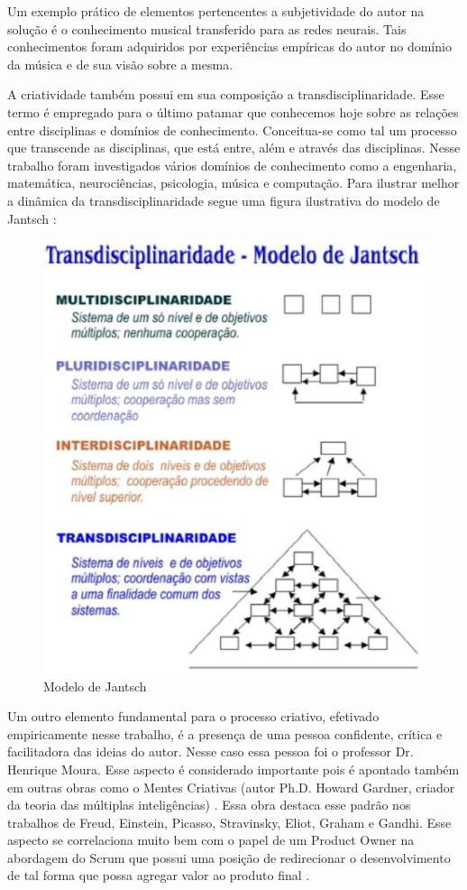 Um exemplo prático de elementos pertencentes a subjetividade do autor na solução é o conhecimento musical transferido para as redes neurais. Tais conhecimentos foram adquiridos por experiências empíricas do autor no domínio da música e de sua visão sobre a mesma.

A criatividade também possui em sua composição a transdisciplinaridade. Esse termo é empregado para o último patamar que conhecemos hoje sobre as relações entre disciplinas e domínios de conhecimento. Conceitua-se como tal um processo que transcende as disciplinas, que está entre, além e através das disciplinas. Nesse trabalho foram investigados vários domínios de conhecimento como a engenharia, matemática, neurociências, psicologia, música e computação. Para ilustrar melhor a dinâmica da transdisciplinaridade segue uma figura ilustrativa do modelo de Jantsch \cite{jantsh}:

\begin{figure}[h]
	\centering
		\includegraphics[keepaspectratio=true,scale=0.7]{figuras/trans.eps}
	\caption{Modelo de Jantsch}
\end{figure}

Um outro elemento fundamental para o processo criativo, efetivado empiricamente nesse trabalho, é a presença de uma pessoa confidente, crítica e facilitadora das ideias do autor. Nesse caso essa pessoa foi o professor Dr. Henrique Moura. Esse aspecto é considerado importante pois é apontado também em outras obras como o Mentes Criativas (autor Ph.D. Howard Gardner, criador da teoria das múltiplas inteligências) \cite{gardner}. Essa obra destaca esse padrão nos trabalhos de Freud, Einstein, Picasso, Stravinsky, Eliot, Graham e Gandhi. Esse aspecto se correlaciona muito bem com o papel de um Product Owner na abordagem do Scrum que possui uma posição de redirecionar o desenvolvimento de tal forma que possa agregar valor ao produto final \cite{PO}.

